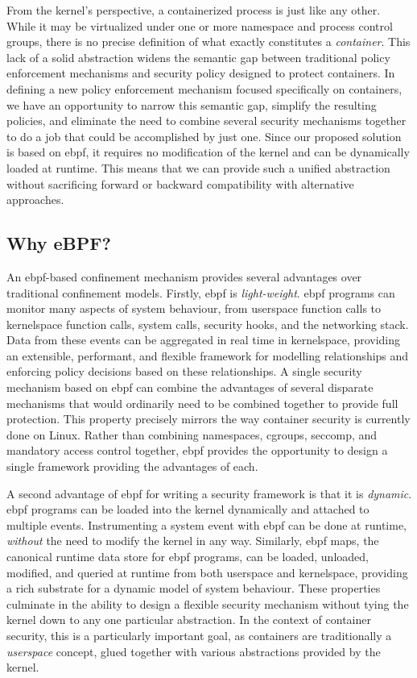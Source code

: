 From the kernel's perspective, a containerized process is just like any other. While it
may be virtualized under one or more namespace and process control groups, there is no
precise definition of what exactly constitutes a \textit{container}. This lack of a solid
abstraction widens the semantic gap between traditional policy enforcement mechanisms and
security policy designed to protect containers. In defining a new policy enforcement
mechanism focused specifically on containers, we have an opportunity to narrow this
semantic gap, simplify the resulting policies, and eliminate the need to combine several
security mechanisms together to do a job that could be accomplished by just one. Since our
proposed solution is based on \gls{ebpf}, it requires no modification of the kernel and can be
dynamically loaded at runtime.  This means that we can provide such a unified abstraction
without sacrificing forward or backward compatibility with alternative approaches.

\subsection{Why eBPF?}%
\label{ss:why-ebpf}

An \gls{ebpf}-based confinement mechanism provides several advantages over traditional
confinement models.  Firstly, \gls{ebpf} is \textit{light-weight}. \gls{ebpf} programs can monitor
many aspects of system behaviour, from userspace function calls to kernelspace function
calls, system calls, security hooks, and the networking stack. Data from these events can
be aggregated in real time in kernelspace, providing an extensible, performant, and
flexible framework for modelling relationships and enforcing policy decisions based on
these relationships.  A single security mechanism based on \gls{ebpf} can combine the advantages
of several disparate mechanisms that would ordinarily need to be combined together to
provide full protection. This property precisely mirrors the way container security is
currently done on Linux. Rather than combining namespaces, cgroups, seccomp, and mandatory
access control together, \gls{ebpf} provides the opportunity to design a single framework
providing the advantages of each.

A second advantage of \gls{ebpf} for writing a security framework is that it is
\textit{dynamic}. \gls{ebpf} programs can be loaded into the kernel dynamically and attached to
multiple events. Instrumenting a system event with \gls{ebpf} can be done at runtime,
\textit{without} the need to modify the kernel in any way.  Similarly, \gls{ebpf} maps, the
canonical runtime data store for \gls{ebpf} programs, can be loaded, unloaded, modified, and
queried at runtime from both userspace and kernelspace, providing a rich substrate for
a dynamic model of system behaviour. These properties culminate in the ability to design
a flexible security mechanism without tying the kernel down to any one particular
abstraction. In the context of container security, this is a particularly important goal,
as containers are traditionally a \textit{userspace} concept, glued together with various
abstractions provided by the kernel.

